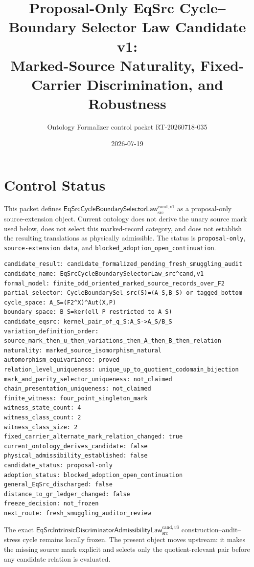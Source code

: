 \documentclass[11pt]{article}
\title{Proposal-Only EqSrc Cycle--Boundary Selector Law Candidate v1:\\
Marked-Source Naturality, Fixed-Carrier Discrimination, and Robustness}
\author{Ontology Formalizer control packet RT-20260718-035}
\date{2026-07-19}
\begin{document}
\maketitle

\section{Control Status}

This packet defines
\(\mathsf{EqSrcCycleBoundarySelectorLaw}^{\mathrm{cand},v1}_{\mathrm{src}}\)
as a proposal-only source-extension object. Current ontology does not derive
the unary source mark used below, does not select this marked-record category,
and does not establish the resulting translations as physically admissible.
The status is \texttt{proposal-only}, \texttt{source-extension data}, and
\texttt{blocked\_adoption\_open\_continuation}.

\begin{verbatim}
candidate_result: candidate_formalized_pending_fresh_smuggling_audit
candidate_name: EqSrcCycleBoundarySelectorLaw_src^cand,v1
formal_model: finite_odd_oriented_marked_source_records_over_F2
partial_selector: CycleBoundarySel_src(S)=(A_S,B_S) or tagged_bottom
cycle_space: A_S=(F2^X)^Aut(X,P)
boundary_space: B_S=ker(ell_P restricted to A_S)
candidate_eqsrc: kernel_pair_of_q_S:A_S->A_S/B_S
variation_definition_order: source_mark_then_u_then_variations_then_A_then_B_then_relation
naturality: marked_source_isomorphism_natural
automorphism_equivariance: proved
relation_level_uniqueness: unique_up_to_quotient_codomain_bijection
mark_and_parity_selector_uniqueness: not_claimed
chain_presentation_uniqueness: not_claimed
finite_witness: four_point_singleton_mark
witness_state_count: 4
witness_class_count: 2
witness_class_size: 2
fixed_carrier_alternate_mark_relation_changed: true
current_ontology_derives_candidate: false
physical_admissibility_established: false
candidate_status: proposal-only
adoption_status: blocked_adoption_open_continuation
general_EqSrc_discharged: false
distance_to_gr_ledger_changed: false
freeze_decision: not_frozen
next_route: fresh_smuggling_auditor_review
\end{verbatim}

The exact
\(\mathsf{EqSrcIntrinsicDiscriminatorAdmissibilityLaw}^{\mathrm{cand},v3}_{\mathrm{src}}\)
construction--audit--stress cycle remains locally frozen. The present object
moves upstream: it makes the missing source mark explicit and selects only the
quotient-relevant pair before any candidate relation is evaluated.
\end{document}

